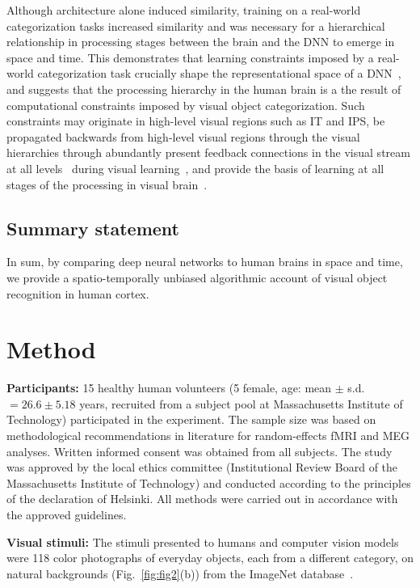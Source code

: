 \documentclass[10pt,twocolumn,letterpaper]{article}
\begin{document}
Although architecture alone induced similarity, training on a real-world categorization tasks increased similarity and was necessary for a hierarchical relationship in processing stages between the brain and the DNN to emerge in space and time. This demonstrates that learning constraints imposed by a real-world categorization task crucially shape the representational space of a DNN~\cite{yamins2014performance}, and suggests that the processing hierarchy in the human brain is a the result of computational constraints imposed by visual object categorization. Such constraints may originate in high-level visual regions such as IT and IPS, be propagated backwards from high-level visual regions through the visual hierarchies through abundantly present feedback connections in the visual stream at all levels~\cite{van1994multiple} during visual learning~\cite{ahissar2004reverse}, and provide the basis of learning at all stages of the processing in visual brain~\cite{kourtzi2006learning}.

\subsection{Summary statement}
In sum, by comparing deep neural networks to human brains in space and time, we provide a spatio-temporally unbiased algorithmic account of visual object recognition in human cortex.

\section{Method}
\textbf{Participants:}
15 healthy human volunteers (5 female, age: mean $\pm$ s.d. $= 26.6 \pm 5.18$ years, recruited from a subject pool at Massachusetts Institute of Technology) participated in the experiment. The sample size was based on methodological recommendations in literature for random-effects fMRI and MEG analyses. Written informed consent was obtained from all subjects. The study was approved by the local ethics committee (Institutional Review Board of the Massachusetts Institute of Technology) and conducted according to the principles of the declaration of Helsinki. All methods were carried out in accordance with the approved guidelines.

\textbf{Visual stimuli:}
The stimuli presented to humans and computer vision models were 118 color photographs of everyday objects, each from a different category, on natural backgrounds (Fig.~\ref{fig:fig2}(b)) from the ImageNet database~\cite{deng2009imagenet}.
\end{document}
